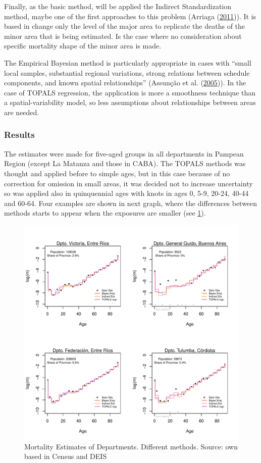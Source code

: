 \documentclass[12pt,]{article}
\begin{document}
Finally, as the basic method, will be applied the Indirect
Standardization method, maybe one of the first approaches to this
problem (Arriaga (\protect\hyperlink{ref-Arriaga2011}{2011})). It is
based in change only the level of the major area to replicate the deaths
of the minor area that is being estimated. Is the case where no
consideration about specific mortality shape of the minor area is made.

The Empirical Bayesian method is particularly appropriate in cases with
``small local samples, substantial regional variations, strong relations
between schedule components, and known spatial relationships'' (Assunção
et al. (\protect\hyperlink{ref-Assuncao2005}{2005})). In the case of
TOPALS regression, the application is more a smoothness technique than a
spatial-variability model, so less assumptions about relationships
between areas are needed.

\hypertarget{results-1}{%
\subsubsection{\texorpdfstring{\textbf{Results}}{Results}}\label{results-1}}

The estimates were made for five-aged groups in all departments in
Pampean Region (except La Matanza and those in CABA). The TOPALS methods
was thought and applied before to simple ages, but in this case because
of no correction for omission in small areas, it was decided not to
increase uncertainty so was applied also in quinquennial ages with knots
in ages 0, 5-9, 20-24, 40-44 and 60-64. Four examples are shown in next
graph, where the differences between methods starts to appear when the
exposures are smaller (see \ref{fig:Ajuste}).

\begin{figure}

{\centering \includegraphics[width=0.7\linewidth]{plots/Ajuste} 

}

\caption{Mortality Estimates of Departments. Different methods. Source: own based in Census and DEIS}\label{fig:Ajuste}
\end{figure}
\end{document}
